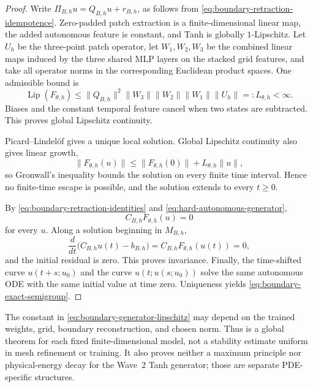 \begin{proof}
Write $\Pi_{B,h}u=Q_{B,h}u+r_{B,h}$, as follows from \eqref{eq:boundary-retraction-idempotence}.  Zero-padded patch extraction is a finite-dimensional linear map, the added autonomous feature is constant, and Tanh is globally $1$-Lipschitz.  Let $U_h$ be the three-point patch operator, let $W_1,W_2,W_3$ be the combined linear maps induced by the three shared MLP layers on the stacked grid features, and take all operator norms in the corresponding Euclidean product spaces.  One admissible bound is
\begin{equation}\label{eq:boundary-generator-lipschitz}
\operatorname{Lip}(F_{\theta,h})\leq \lVert Q_{B,h}\rVert^2\lVert W_3\rVert\lVert W_2\rVert\lVert W_1\rVert\lVert U_h\rVert=:L_{\theta,h}<\infty.
\end{equation}
Biases and the constant temporal feature cancel when two states are subtracted.  This proves global Lipschitz continuity.

Picard--Lindel\"of gives a unique local solution.  Global Lipschitz continuity also gives linear growth,
\begin{equation*}
\lVert F_{\theta,h}(u)\rVert\leq \lVert F_{\theta,h}(0)\rVert+L_{\theta,h}\lVert u\rVert,
\end{equation*}
so Gronwall's inequality bounds the solution on every finite time interval.  Hence no finite-time escape is possible, and the solution extends to every $t\geq0$.

By \eqref{eq:boundary-retraction-identities} and \eqref{eq:hard-autonomous-generator},
\begin{equation*}
C_{B,h}F_{\theta,h}(u)=0
\end{equation*}
for every $u$.  Along a solution beginning in $M_{B,h}$,
\begin{equation*}
\frac{d}{dt}\bigl(C_{B,h}u(t)-b_{B,h}\bigr)=C_{B,h}F_{\theta,h}(u(t))=0,
\end{equation*}
and the initial residual is zero.  This proves invariance.  Finally, the time-shifted curve $u(t+s;u_0)$ and the curve $u(t;u(s;u_0))$ solve the same autonomous ODE with the same initial value at time zero.  Uniqueness yields \eqref{eq:boundary-exact-semigroup}.
\end{proof}

\begin{remark}\label{rem:fixed-grid-guarantee}
The constant in \eqref{eq:boundary-generator-lipschitz} may depend on the trained weights, grid, boundary reconstruction, and chosen norm.  Thus  is a global theorem for each fixed finite-dimensional model, not a stability estimate uniform in mesh refinement or training.  It also proves neither a maximum principle nor physical-energy decay for the Wave~2 Tanh generator; those are separate PDE-specific structures.
\end{remark}

